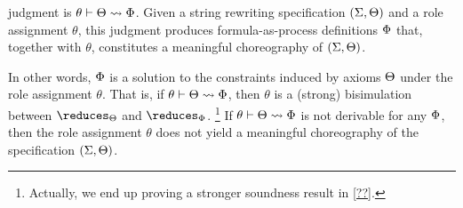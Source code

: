  judgment is $\theta \vdash \Theta \rightsquigarrow \Phi$.
Given a string rewriting specification $(\Sigma, \Theta)$ and a role assignment $\theta$, this judgment produces formula-as-process definitions $\Phi$ that, together with $\theta$, constitutes a meaningful choreography of $(\Sigma, \Theta)$.

In other words, $\Phi$ is a solution to the constraints induced by axioms $\Theta$ under the role assignment $\theta$.
That is, if $\theta \vdash \Theta \rightsquigarrow \Phi$, then $\theta$ is a (strong) bisimulation between $\reduces_{\srsig}$ and $\reduces_{\orsig}$.
\footnote{%
  Actually, we end up proving a stronger soundness result in \cref{??}.}
%
If $\theta \vdash \Theta \rightsquigarrow \Phi$ is not derivable for any $\Phi$, then the role assignment $\theta$ does not yield a meaningful choreography of the specification $(\Sigma, \Theta)$.


